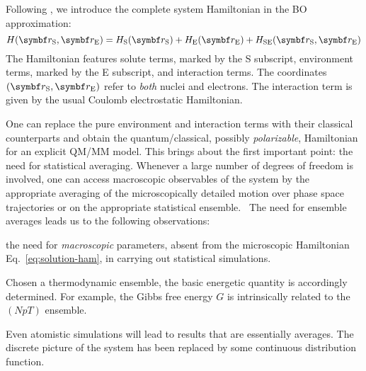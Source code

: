 Following \citeauthor{Tomasi2007-es}, we introduce the complete system
Hamiltonian in the \acrshort{BO} approximation:~\autocite{Tomasi2004-dc,
Tomasi2007-es}
\begin{equation}\label{eq:solution-ham}
 H(\vect{r}_\mathrm{S}, \vect{r}_\mathrm{E}) =
  H_\mathrm{S}(\vect{r}_\mathrm{S}) +  H_\mathrm{E}(\vect{r}_\mathrm{E})
+ H_\mathrm{SE}(\vect{r}_\mathrm{S}, \vect{r}_\mathrm{E})
\end{equation}
The Hamiltonian features solute terms, marked by the S subscript,
environment terms, marked by the E subscript, and interaction terms.
The coordinates $(\vect{r}_\mathrm{S}, \vect{r}_\mathrm{E})$ refer to
\emph{both} nuclei and electrons.
The interaction term is given by the usual Coulomb electrostatic
Hamiltonian.

One can replace the pure environment and interaction terms with their
classical counterparts and obtain the quantum/classical, possibly
\emph{polarizable}, Hamiltonian for an explicit \acrshort{QM}/\acrshort{MM} model.
This brings about the first important point: the need for statistical
averaging.
Whenever a large number of degrees of freedom is involved, one can
access macroscopic observables of the system by the appropriate
averaging of the microscopically detailed motion over phase space
trajectories or on the appropriate statistical
ensemble.~\autocite{Hill1960-ql}
The need for ensemble averages leads us to the following observations:
\begin{enumerate*}[label={\alph*)},font={\color{PMS1797}}]
 \item
   the need for \emph{macroscopic} parameters, absent from the
   microscopic Hamiltonian Eq.~\eqref{eq:solution-ham}, in carrying out
   statistical simulations.
 \item
   Chosen a thermodynamic ensemble, the basic energetic quantity is
   accordingly determined. For example, the Gibbs free energy  $G$ is
   intrinsically related to the $(NpT)$ ensemble.
 \item
   Even atomistic simulations will lead to results that are essentially
   averages. The discrete picture of the system has been replaced by
   some continuous distribution function.
\end{enumerate*}

